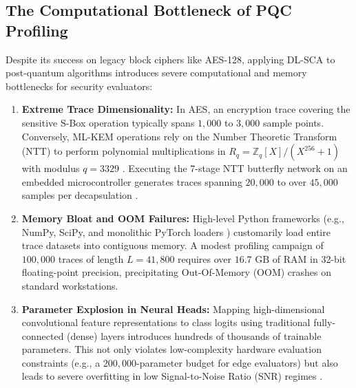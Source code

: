 \documentclass[letterpaper]{article}
\begin{document}
\subsection{The Computational Bottleneck of PQC Profiling}
Despite its success on legacy block ciphers like AES-128, applying DL-SCA to post-quantum algorithms introduces severe computational and memory bottlenecks for security evaluators:
\begin{enumerate}
    \item \textbf{Extreme Trace Dimensionality:} In AES, an encryption trace covering the sensitive S-Box operation typically spans $1,000$ to $3,000$ sample points. Conversely, ML-KEM operations rely on the Number Theoretic Transform (NTT) to perform polynomial multiplications in $R_q = \mathbb{Z}_q[X]/(X^{256} + 1)$ with modulus $q = 3329$ \cite{bos2018crystals,roychoudhury2019accelerating}. Executing the 7-stage NTT butterfly network on an embedded microcontroller generates traces spanning $20,000$ to over $45,000$ samples per decapsulation \cite{amiet2020leakage,pessl2020masked,ueno2022curse}.
    \item \textbf{Memory Bloat and OOM Failures:} High-level Python frameworks (e.g., NumPy, SciPy, and monolithic PyTorch loaders \cite{paszke2019pytorch}) customarily load entire trace datasets into contiguous memory. A modest profiling campaign of $100,000$ traces of length $L = 41,800$ requires over $16.7\text{ GB}$ of RAM in 32-bit floating-point precision, precipitating Out-Of-Memory (OOM) crashes on standard workstations.
    \item \textbf{Parameter Explosion in Neural Heads:} Mapping high-dimensional convolutional feature representations to class logits using traditional fully-connected (dense) layers introduces hundreds of thousands of trainable parameters. This not only violates low-complexity hardware evaluation constraints (e.g., a $200,000$-parameter budget for edge evaluators) but also leads to severe overfitting in low Signal-to-Noise Ratio (SNR) regimes \cite{novikov2015tensorizing}.
\end{enumerate}
\end{document}
